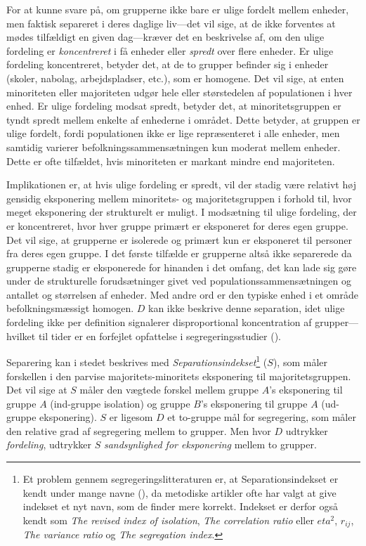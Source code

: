 \documentclass[
]{book}
\begin{document}
For at kunne svare på, om grupperne ikke bare er ulige fordelt mellem enheder, men faktisk separeret i deres daglige liv---det vil sige, at de ikke forventes at mødes tilfældigt en given dag---kræver det en beskrivelse af, om den ulige fordeling er \emph{koncentreret} i få enheder eller \emph{spredt} over flere enheder. Er ulige fordeling koncentreret, betyder det, at de to grupper befinder sig i enheder (skoler, nabolag, arbejdspladser, etc.), som er homogene. Det vil sige, at enten minoriteten eller majoriteten udgør hele eller størstedelen af populationen i hver enhed. Er ulige fordeling modsat spredt, betyder det, at minoritetsgruppen er tyndt spredt mellem enkelte af enhederne i området. Dette betyder, at gruppen er ulige fordelt, fordi populationen ikke er lige repræsenteret i alle enheder, men samtidig varierer befolkningssammensætningen kun moderat mellem enheder. Dette er ofte tilfældet, hvis minoriteten er markant mindre end majoriteten.

Implikationen er, at hvis ulige fordeling er spredt, vil der stadig være relativt høj gensidig eksponering mellem minoritets- og majoritetsgruppen i forhold til, hvor meget eksponering der strukturelt er muligt. I modsætning til ulige fordeling, der er koncentreret, hvor hver gruppe primært er eksponeret for deres egen gruppe. Det vil sige, at grupperne er isolerede og primært kun er eksponeret til personer fra deres egen gruppe. I det første tilfælde er grupperne altså ikke separerede da grupperne stadig er eksponerede for hinanden i det omfang, det kan lade sig gøre under de strukturelle forudsætninger givet ved populationssammensætningen og antallet og størrelsen af enheder. Med andre ord er den typiske enhed i et område befolkningsmæssigt homogen. \(D\) kan ikke beskrive denne separation, idet ulige fordeling ikke per definition signalerer disproportional koncentration af grupper---hvilket til tider er en forfejlet opfattelse i segregeringsstudier ().

Separering kan i stedet beskrives med \emph{Separationsindekset}\footnote{Et problem gennem segregeringslitteraturen er, at Separationsindekset er kendt under mange navne (), da metodiske artikler ofte har valgt at give indekset et nyt navn, som de finder mere korrekt. Indekset er derfor også kendt som \emph{The revised index of isolation}, \emph{The correlation ratio} eller \(eta^{2}\), \(r_{ij}\), \emph{The variance ratio} og \emph{The segregation index}.} (\(S\)), som måler forskellen i den parvise majoritets-minoritets eksponering til majoritetsgruppen. Det vil sige at \(S\) måler den vægtede forskel mellem gruppe \(A\)'s eksponering til gruppe \(A\) (ind-gruppe isolation) og gruppe \(B\)'s eksponering til gruppe \(A\) (ud-gruppe eksponering). \(S\) er ligesom \(D\) et to-gruppe mål for segregering, som måler den relative grad af segregering mellem to grupper. Men hvor \(D\) udtrykker \emph{fordeling}, udtrykker \(S\) \emph{sandsynlighed for eksponering} mellem to grupper.
\end{document}
